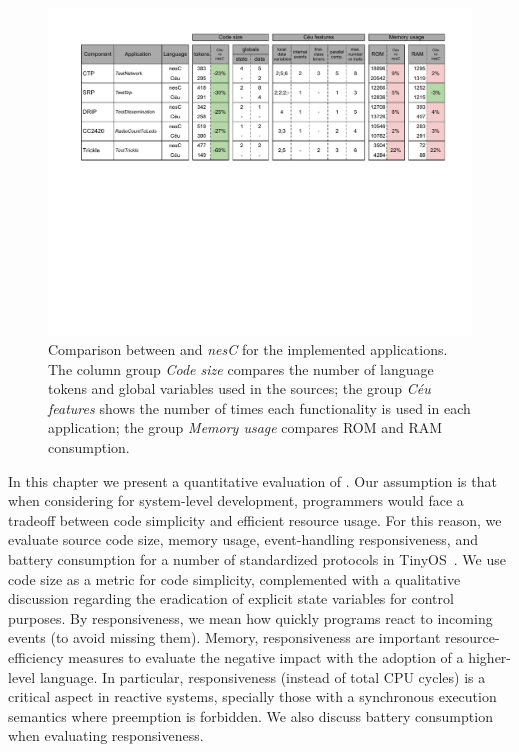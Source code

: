 %

\begin{figure}[t]
\includegraphics{eval}
\caption{ Comparison between \CEU and \emph{nesC} for the implemented 
applications. \newline
{\small %
The column group \emph{Code size} compares the number of language tokens and 
global variables used in the sources;
the group \emph{C\'eu features} shows the number of times each functionality is 
used in each application;
the group \emph{Memory usage} compares ROM and RAM consumption.
}%
\label{fig.eval}
}
\end{figure}

In this chapter we present a quantitative evaluation of \CEU.
%
Our assumption is that when considering \CEU for system-level development, 
programmers would face a tradeoff between code simplicity and efficient 
resource usage.
%
For this reason, we evaluate source code size, memory usage, event-handling 
responsiveness, and battery consumption for a number of standardized protocols 
in TinyOS~\cite{wsn.teps}.
%
We use code size as a metric for code simplicity, complemented with a 
qualitative discussion regarding the eradication of explicit state variables 
for control purposes.
%
By responsiveness, we mean how quickly programs react to incoming events (to 
avoid missing them).
%
Memory, responsiveness are important resource-efficiency measures to evaluate 
the negative impact with the adoption of a higher-level language.
%
In particular, responsiveness (instead of total CPU cycles) is a critical 
aspect in reactive systems, specially those with a synchronous execution 
semantics where preemption is forbidden.
%
We also discuss battery consumption when evaluating responsiveness.

